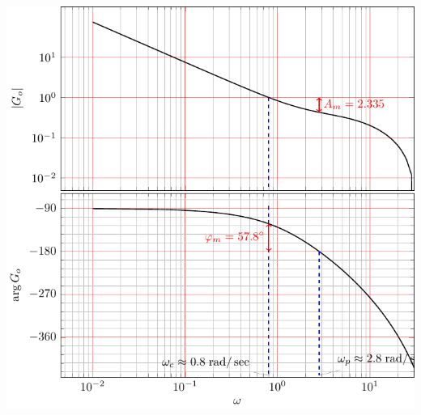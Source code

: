 \documentclass{scrartcl}
\begin{document}
   \begin{center}
   \includegraphics[width=0.8\linewidth]{bode-openloop-exam-solution}
   \end{center}
\end{document}
